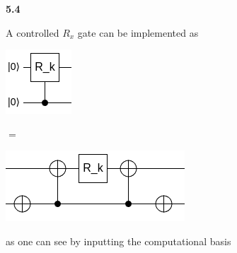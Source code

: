\textbf{5.4}

A controlled $R_x$ gate can be implemented as

\begin{minipage}{0.20\textwidth}

\includegraphics[scale = 0.5]{images/5.4.png}
    
\end{minipage}
\begin{minipage}{0.1\textwidth}
    $=$
\end{minipage}
\begin{minipage}{0.5\textwidth}
       \includegraphics[scale = 0.5]{images/5.4.1.png}
\end{minipage}

as one can see by inputting the computational basis